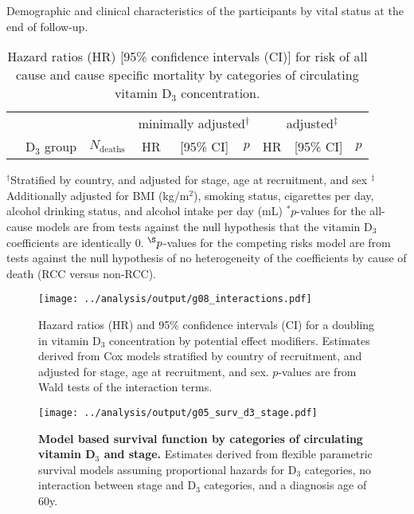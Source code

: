 \documentclass[a4paper,10pt]{article}
\begin{document}
\begin{table}
\caption{Demographic and clinical characteristics of the participants by vital 
status at the end of follow-up.}
\centering

\end{table}

\clearpage 
\begin{table}
\caption{Hazard ratios (HR) [95\% confidence intervals (CI)] for risk of all 
cause and cause specific mortality by categories of circulating vitamin D$_3$ 
concentration.}
\begin{tabular}{lrrrrrrrr}
\toprule
& & &\multicolumn{3}{c}{minimally adjusted$^\dag$} & 
\multicolumn{3}{c}{adjusted$^\ddag$} \\
 \cmidrule(r){4-6} \cmidrule(l){7-9} 
& D$_3$ group & $N_{\text{deaths}}$ & HR & [95\% CI] & $p$ & HR & [95\% CI] & 
$p$ \\
\midrule

\bottomrule
\end{tabular}
\newline
{\footnotesize 
$^\dag$Stratified by country, and adjusted for stage, age at recruitment, and 
sex \newline
$^\ddag$Additionally adjusted for BMI (kg/m$^2$), smoking status, cigarettes 
per day, alcohol drinking status, and alcohol intake per day (mL) \newline
$^*p$-values for the all-cause models are from tests against the null 
hypothesis that the vitamin D$_3$ coefficients are identically 0. 
\newline
$^{\S}p$-values for the competing risks model are from tests against the null 
hypothesis of no heterogeneity of the coefficients by cause of death (RCC 
versus non-RCC).
}
\end{table}
\clearpage

\begin{figure}
 \centering
\caption{Hazard ratios (HR) and 95\% confidence intervals (CI) for a 
doubling in vitamin D$_3$ concentration by potential effect modifiers. 
\footnotesize{Estimates derived from Cox models stratified by country of 
recruitment, and adjusted for stage, age at recruitment, and sex. $p$-values 
are from Wald tests of the interaction terms.}}
\texttt{[image: ../analysis/output/g08\_interactions.pdf]}
\end{figure}


\begin{figure}
 \centering 
\caption{\textbf{Model based survival function by categories of 
circulating 
vitamin D$_3$ and stage.} \footnotesize{Estimates derived from flexible 
parametric survival models assuming proportional hazards for D$_3$ categories, 
no 
interaction between stage and D$_3$ categories, and a diagnosis age of 60y.}} 
\texttt{[image: ../analysis/output/g05\_surv\_d3\_stage.pdf]}
\end{figure}
\end{document}
